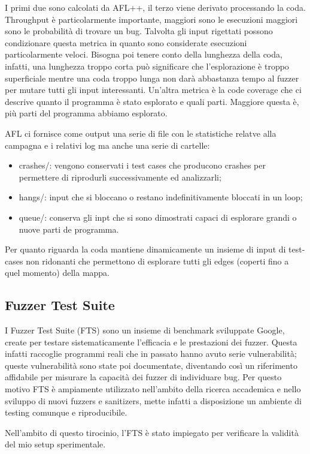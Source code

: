 I primi due sono calcolati da AFL++,  il terzo viene derivato processando la coda. 
Throughput è particolarmente importante, maggiori sono le esecuzioni maggiori sono le probabilità di trovare un bug. Talvolta gli input rigettati possono condizionare questa metrica in quanto sono considerate esecuzioni particolarmente veloci. 
Bisogna poi tenere conto della lunghezza della coda, infatti, una lunghezza troppo corta può significare che l’esplorazione è troppo superficiale mentre una coda troppo lunga non darà abbastanza tempo al fuzzer per mutare tutti gli input interessanti. 
Un’altra metrica è la code coverage che ci descrive quanto il programma è stato esplorato e quali parti. Maggiore questa è, più parti del programma abbiamo esplorato. 

AFL ci fornisce come output una serie di file con le statistiche relatve alla campagna e i relativi log ma anche una serie di cartelle:
\begin{itemize}
    \item crashes/: vengono conservati i test cases che producono crashes per permettere di riprodurli successivamente ed analizzarli;
    \item hangs/: input che si bloccano o restano indefinitivamente bloccati in un loop;
    \item queue/: conserva gli inpt che si sono dimostrati capaci di esplorare grandi o nuove parti de programma.
\end{itemize}
Per quanto riguarda la coda mantiene dinamicamente un insieme di input di test-cases non ridonanti che permettono di esplorare tutti gli edges (coperti fino a quel momento) della mappa. 

\subsection{Fuzzer Test Suite}

I Fuzzer Test Suite (FTS) sono un insieme di benchmark sviluppate Google, create per testare sistematicamente l’efficacia e le prestazioni dei fuzzer. Questa infatti raccoglie programmi reali che in passato hanno avuto serie vulnerabilità; queste vulnerabilità sono state poi documentate, diventando così un riferimento affidabile per misurare la capacità dei fuzzer di individuare bug.  Per questo motivo FTS è ampiamente utilizzato nell’ambito della ricerca accademica e nello sviluppo di nuovi fuzzers e sanitizers, mette infatti a disposizione un ambiente di testing comunque e riproducibile.

Nell’ambito di questo tirocinio, l’FTS è stato impiegato per verificare la validità del mio setup sperimentale.  

